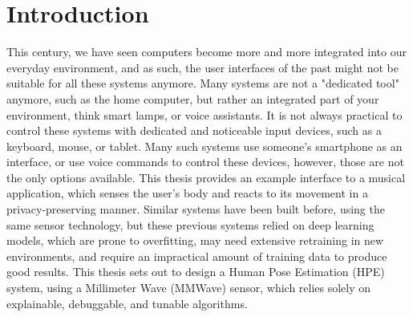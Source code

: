 \chapter{Introduction}
\label{chapter: introduction}


This century, we have seen computers become more and more integrated into our everyday environment, and as such, the user interfaces of the past might not be suitable for all these systems anymore.
Many systems are not a "dedicated tool" anymore, such as the home computer, but rather an integrated part of your environment, think smart lamps, or voice assistants.
It is not always practical to control these systems with dedicated and noticeable input devices, such as a keyboard, mouse, or tablet.
Many such systems use someone's smartphone as an interface, or use voice commands to control these devices, however, those are not the only options available.
This thesis provides an example interface to a musical application, which senses the user's body and reacts to its movement in a privacy-preserving manner.
Similar systems have been built before, using the same sensor technology, but these previous systems relied on deep learning models, which are prone to overfitting, may need extensive retraining in new environments, and require an impractical amount of training data to produce good results.
This thesis sets out to design a Human Pose Estimation (HPE) system, using a Millimeter Wave (MMWave) sensor, which relies solely on explainable, debuggable, and tunable algorithms.







% 
% 

% 

% 

% 

% 

